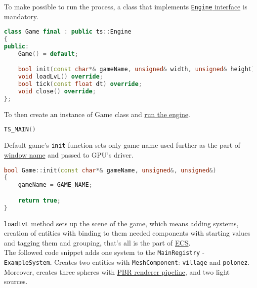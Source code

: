 To make possible to run the process, a class that implements \hyperref[sec:engine_class]{\texttt{Engine} interface} is mandatory. 
\begin{lstlisting}[language=c++, caption=Example of Game class header (./game/game.h)]
class Game final : public ts::Engine
{
public:
    Game() = default;

    bool init(const char*& gameName, unsigned& width, unsigned& height) override;
    void loadLvL() override;
    bool tick(const float dt) override;
    void close() override;
};
\end{lstlisting}
To then create an instance of Game class and \hyperref[sec:run_fun]{run the engine}.
\begin{lstlisting}[language=c++, caption=Game instance (./game/game.cpp)]
TS_MAIN()
\end{lstlisting}
Default game's \texttt{init} function sets only game name used further as the part of \hyperref[sec:window]{window name} and passed to GPU's driver.
\begin{lstlisting}[language=c++, caption=Example of Game Init Function (./game/game.cpp)]
bool Game::init(const char*& gameName, unsigned&, unsigned&)
{
    gameName = GAME_NAME;

    return true;
}
\end{lstlisting}
\texttt{loadLvL} method sets up the scene of the game, which means adding systems, creation of entities with binding to them needed components with starting values and tagging them and grouping, that's all is the part of \hyperref[sec:ecs]{ECS}.\\ The followed code snippet adds one system to the \texttt{MainRegistry} - \texttt{ExampleSystem}. Creates two  entities with \texttt{MeshComponent}: \texttt{village} and \texttt{polonez}. Moreover, creates three spheres with \hyperref[sec:pbr]{PBR renderer pipeline}, and two light sources.
